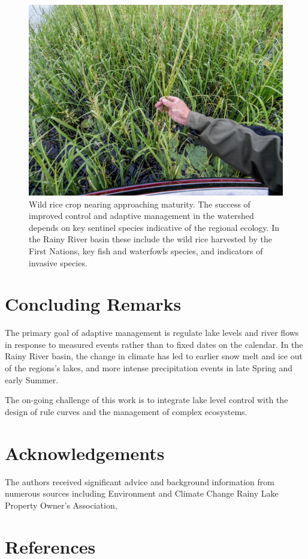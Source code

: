 \documentclass[preprint,times]{elsarticle}
\begin{document}
\begin{figure}
\includegraphics[width=\linewidth]{figures/20150804_194209.jpg}
\caption{Wild rice crop nearing approaching maturity. The success of improved control and adaptive management in the watershed depends on key sentinel species indicative of the regional ecology. In the Rainy River basin these include the wild rice harvested by the First Nations, key fish and waterfowls species, and indicators of invasive species.}\label{figure:12}
\end{figure}

\section{Concluding Remarks}

The primary goal of adaptive management is regulate lake levels and river flows in response to measured events rather than to fixed dates on the calendar. In the Rainy River basin, the change in climate has led to earlier snow melt and ice out of the regions's lakes, and more intense precipitation events in late Spring and early Summer. 

The on-going challenge of this work is to integrate lake level control with the design of rule curves and the management of complex ecosystems. 
\section{Acknowledgements}

The authors received significant advice and background information from numerous sources including Environment and Climate Change Rainy Lake Property Owner's Association, 

\section{References}
\nocite{*}


\end{document}
